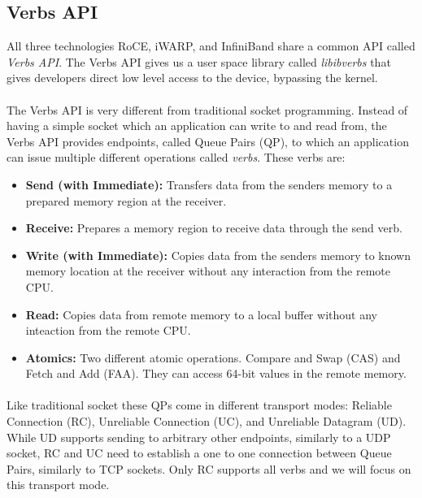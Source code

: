 \subsection{Verbs API}

All three technologies RoCE, iWARP, and InfiniBand share a common API called \emph{Verbs API}. The Verbs API gives us a
user space library called \emph{libibverbs} that gives developers direct low level access to the device, bypassing the kernel.

\paragraph{} The Verbs API is very different from traditional socket programming. Instead of having a simple socket which an 
application can write to and read from, the Verbs API provides endpoints, called Queue Pairs (QP), to which an application 
can issue multiple different operations called \emph{verbs}. These verbs are:

\begin{itemize}
  \item \textbf{Send (with Immediate):} Transfers data from the senders memory to a prepared memory region at the receiver.
  \item \textbf{Receive:} Prepares a memory region to receive data through the send verb.
  \item \textbf{Write (with Immediate):} Copies data from the senders memory to known memory location at the receiver without any 
    interaction from the remote CPU.
  \item \textbf{Read:} Copies data from remote memory to a local buffer without any inteaction from the remote CPU.
  \item \textbf{Atomics:} Two different atomic operations. Compare and Swap (CAS) and Fetch and Add (FAA). They can access 64-bit 
    values in the remote memory. 
\end{itemize}

\paragraph{} Like traditional socket these QPs come in different transport modes: Reliable Connection (RC), Unreliable Connection (UC),
and Unreliable Datagram (UD). While UD supports sending to arbitrary other endpoints, similarly to a UDP socket, RC and UC 
need to establish a one to one connection between Queue Pairs, similarly to TCP sockets. Only RC supports all 
verbs and we will focus on this transport mode.



